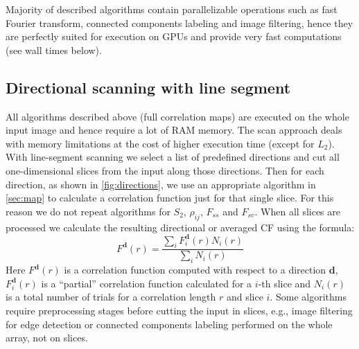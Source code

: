 \documentclass[1p]{elsarticle}
\begin{document}
Majority of described algorithms contain parallelizable operations such as fast
Fourier transform, connected components labeling and image filtering, hence they
are perfectly suited for execution on GPUs and provide very fast computations
(see wall times below).

\subsection{Directional scanning with line segment}
\label{sec:scan}
All algorithms described above (full correlation maps) are executed on the whole
input image and hence require a lot of RAM memory. The scan approach deals with
memory limitations at the cost of higher execution time (except for $L_2$). With
line-segment scanning we select a list of predefined directions and cut all
one-dimensional slices from the input along those directions. Then for each
direction, as shown in \cref{fig:directions}, we use an appropriate algorithm in
\cref{sec:map} to calculate a correlation function just for that single
slice. For this reason we do not repeat algorithms for $S_2$, $\rho_{ij}$,
$F_{ss}$ and $F_{sv}$.  When all slices are processed we calculate the resulting
directional or averaged CF using the formula:
\begin{equation*}
  F^{\bm{d}}(r) = \frac{\sum\limits_i F^{\bm{d}}_i(r) N_i(r)}{\sum\limits_i N_i(r)}
\end{equation*}
Here $F^{\bm{d}}(r)$ is a correlation function computed with respect to a
direction $\bm{d}$, $F^{\bm{d}}_i(r)$ is a ``partial'' correlation
function calculated for a $i$-th slice and $N_i(r)$ is a total number of trials
for a correlation length $r$ and slice $i$. Some algorithms require
preprocessing stages before cutting the input in slices, e.g., image filtering
for edge detection or connected components labeling performed on the whole
array, not on slices.
\end{document}

